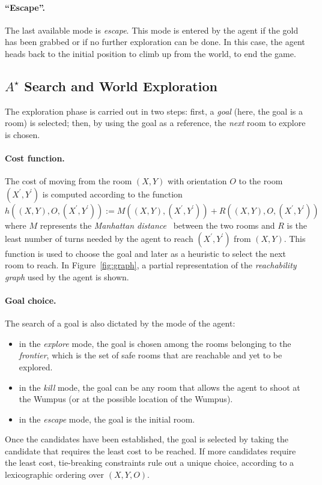 \documentclass{llncs}
\begin{document}
\paragraph{\enquote{Escape}.} The last available mode is \emph{escape}.
This mode is entered by the agent if the gold has been grabbed or if no further exploration can be done.
In this case, the agent heads back to the initial position to climb up from the world, to end the game.

\subsection{$A^{\star}$ Search and World Exploration}

The exploration phase is carried out in two steps: first, a \emph{goal} (here, the goal is a room) is selected; then, by using the goal as a reference, the \emph{next} room to explore is chosen.

\paragraph{Cost function.} The cost of moving from the room $(X,Y)$ with orientation $O$ to the room $(X^\prime,Y^\prime)$ is computed according to the function 
\begin{equation}	
	h((X,Y),O,(X^\prime,Y^\prime)) := M((X,Y),(X^\prime,Y^\prime)) + R((X,Y),O,(X^\prime,Y^\prime))\label{eqn:heur}
\end{equation}
where $M$ represents the \emph{Manhattan distance}~\cite{Manhattan} between the two rooms and $R$ is the least number of turns needed by the agent to reach $(X^\prime,Y^\prime)$ from $(X,Y)$.
This function is used to choose the goal and later as a heuristic to select the next room to reach.
In Figure~\ref{fig:graph}, a partial representation of the \emph{reachability graph} used by the agent is shown.

\paragraph{Goal choice.} The search of a goal is also dictated by the mode of the agent:
\begin{itemize}
	\item in the \emph{explore} mode, the goal is chosen among the rooms belonging to the \emph{frontier}, which is the set of safe rooms that are reachable and yet to be explored.
	\item in the \emph{kill} mode, the goal can be any room that allows the agent to shoot at the Wumpus (or at the possible location of the Wumpus).
	\item in the \emph{escape} mode, the goal is the initial room.
\end{itemize}
Once the candidates have been established, the goal is selected by taking the candidate that requires the least cost to be reached.
If more candidates require the least cost, tie-breaking constraints rule out a unique choice, according to a lexicographic ordering over $(X,Y,O)$.
\end{document}
